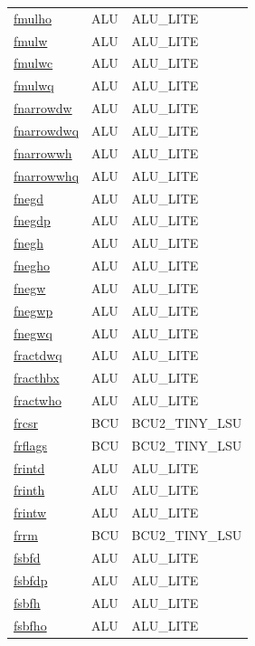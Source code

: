 \begin{small}
\begin{longtable}[l]{l l l}
\hyperlink{lvx.fmulho}{fmulho} & ALU & ALU\_LITE \\ 
\hyperlink{lvx.fmulw}{fmulw} & ALU & ALU\_LITE \\ 
\hyperlink{lvx.fmulwc}{fmulwc} & ALU & ALU\_LITE \\ 
\hyperlink{lvx.fmulwq}{fmulwq} & ALU & ALU\_LITE \\ 
\hyperlink{lvx.fnarrowdw}{fnarrowdw} & ALU & ALU\_LITE \\ 
\hyperlink{lvx.fnarrowdwq}{fnarrowdwq} & ALU & ALU\_LITE \\ 
\hyperlink{lvx.fnarrowwh}{fnarrowwh} & ALU & ALU\_LITE \\ 
\hyperlink{lvx.fnarrowwhq}{fnarrowwhq} & ALU & ALU\_LITE \\ 
\hyperlink{lvx.fnegd}{fnegd} & ALU & ALU\_LITE \\ 
\hyperlink{lvx.fnegdp}{fnegdp} & ALU & ALU\_LITE \\ 
\hyperlink{lvx.fnegh}{fnegh} & ALU & ALU\_LITE \\ 
\hyperlink{lvx.fnegho}{fnegho} & ALU & ALU\_LITE \\ 
\hyperlink{lvx.fnegw}{fnegw} & ALU & ALU\_LITE \\ 
\hyperlink{lvx.fnegwp}{fnegwp} & ALU & ALU\_LITE \\ 
\hyperlink{lvx.fnegwq}{fnegwq} & ALU & ALU\_LITE \\ 
\hyperlink{lvx.fractdwq}{fractdwq} & ALU & ALU\_LITE \\ 
\hyperlink{lvx.fracthbx}{fracthbx} & ALU & ALU\_LITE \\ 
\hyperlink{lvx.fractwho}{fractwho} & ALU & ALU\_LITE \\ 
\hyperlink{lvx.frcsr}{frcsr} & BCU & BCU2\_TINY\_LSU \\ 
\hyperlink{lvx.frflags}{frflags} & BCU & BCU2\_TINY\_LSU \\ 
\hyperlink{lvx.frintd}{frintd} & ALU & ALU\_LITE \\ 
\hyperlink{lvx.frinth}{frinth} & ALU & ALU\_LITE \\ 
\hyperlink{lvx.frintw}{frintw} & ALU & ALU\_LITE \\ 
\hyperlink{lvx.frrm}{frrm} & BCU & BCU2\_TINY\_LSU \\ 
\hyperlink{lvx.fsbfd}{fsbfd} & ALU & ALU\_LITE \\ 
\hyperlink{lvx.fsbfdp}{fsbfdp} & ALU & ALU\_LITE \\ 
\hyperlink{lvx.fsbfh}{fsbfh} & ALU & ALU\_LITE \\ 
\hyperlink{lvx.fsbfho}{fsbfho} & ALU & ALU\_LITE \\ 

\end{longtable}
\end{small}
